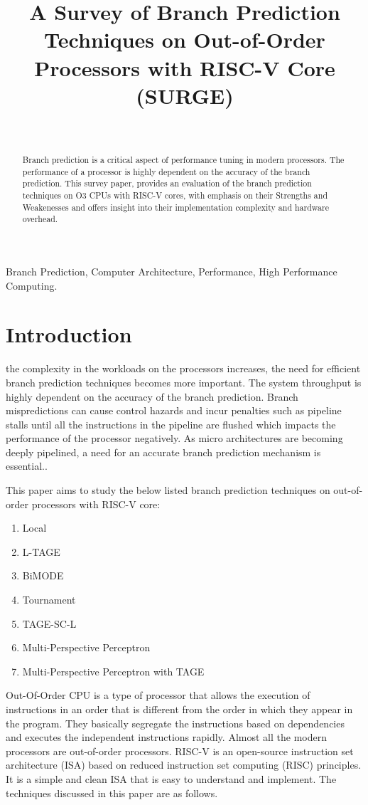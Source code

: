 \documentclass[10pt,journal,compsoc]{IEEEtran}
\begin{document}
\title{A Survey of Branch Prediction Techniques on Out-of-Order Processors with RISC-V Core (SURGE)}
\author{\\
}
\maketitle
\begin{abstract}
    Branch prediction is a critical aspect of performance tuning in modern processors. 
    The performance of a processor is highly dependent on the accuracy of the branch prediction.
    This survey paper, provides an evaluation of the branch prediction techniques on O3 CPUs with RISC-V cores, with emphasis on their Strengths and Weakenesses and 
    offers insight into their implementation complexity and hardware overhead.
\end{abstract}
\begin{IEEEkeywords}
Branch Prediction, Computer Architecture, Performance, High Performance Computing.
\end{IEEEkeywords}
\section{Introduction}
 the complexity in the workloads on the processors increases, the 
need for efficient branch prediction techniques becomes more important. The system throughput is 
highly dependent on the accuracy of the branch prediction. Branch mispredictions can cause control hazards 
and incur penalties such as pipeline stalls until all the instructions in the pipeline are flushed which impacts
the performance of the processor negatively. As micro architectures are becoming deeply pipelined, a need for an accurate branch prediction mechanism is essential.\cite{1003559}.

This paper aims to study the below listed branch prediction techniques on out-of-order processors with RISC-V core:
\begin{enumerate}
    \item Local
    \item L-TAGE
    \item BiMODE
    \item Tournament
    \item TAGE-SC-L
    \item Multi-Perspective Perceptron
    \item Multi-Perspective Perceptron with TAGE
\end{enumerate}
Out-Of-Order CPU is a type of processor that allows the execution of instructions in an order that is different from the order in which they appear in the program.
They basically segregate the instructions based on dependencies and executes the independent instructions rapidly. Almost all the modern processors are out-of-order processors.
RISC-V is an open-source instruction set architecture (ISA) based on reduced instruction set computing (RISC) principles. It is a simple and clean ISA that is easy to understand and implement.
The techniques discussed in this paper are as follows.
\end{document}
